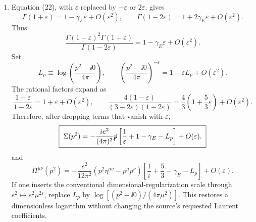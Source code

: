 \begin{enumerate}
\begin{enumerate}
\item
Equation (22), with \(\varepsilon\) replaced by \(-\varepsilon\) or
\(2\varepsilon\), gives
\[
 \Gamma(1+\varepsilon)=1-\gamma_E\varepsilon+O(\varepsilon^2),
 \qquad
 \Gamma(1-2\varepsilon)=1+2\gamma_E\varepsilon
 +O(\varepsilon^2).
\]
Thus
\[
 \frac{\Gamma(1-\varepsilon)^2\Gamma(1+\varepsilon)}
 {\Gamma(1-2\varepsilon)}
 =1-\gamma_E\varepsilon+O(\varepsilon^2).
\]
Set
\[
 L_p\equiv\log\!\left(\frac{p^2-\ii0}{4\pi}\right),
 \qquad
 \left(\frac{p^2-\ii0}{4\pi}\right)^{-\varepsilon}
 =1-\varepsilon L_p+O(\varepsilon^2).
\]
The rational factors expand as
\[
 \frac{1-\varepsilon}{1-2\varepsilon}
 =1+\varepsilon+O(\varepsilon^2),
 \qquad
 \frac{4(1-\varepsilon)}{(3-2\varepsilon)(1-2\varepsilon)}
 =\frac43\left(1+\frac53\varepsilon\right)
 +O(\varepsilon^2).
\]
Therefore, after dropping terms that vanish with \(\varepsilon\),
\[
 \boxed{\;
 \Sigma(p^2)
 =-\frac{ie^2}{(4\pi)^2}\slashed p
 \left[\frac1\varepsilon+1-\gamma_E-L_p\right]
 +O(\varepsilon).
 \;}
\]
and
\[
 \boxed{\;
 \Pi^{\mu\nu}(p^2)
 =-\frac{e^2}{12\pi^2}
 (p^2\eta^{\mu\nu}-p^\mu p^\nu)
 \left[\frac1\varepsilon+\frac53-\gamma_E-L_p\right]
 +O(\varepsilon).
 \;}
\]
If one inserts the conventional dimensional-regularization scale through
\(e^2\mapsto e^2\mu^{2\varepsilon}\), replace
\(L_p\) by \(\log[(p^2-\ii0)/(4\pi\mu^2)]\).  This restores a dimensionless
logarithm without changing the source's requested Laurent coefficients.
\end{enumerate}


\end{enumerate}
